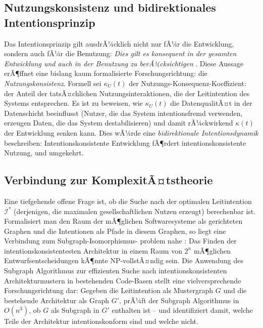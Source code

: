 ﻿\documentclass[a4paper,12pt]{article}
\theoremstyle{definition}
\begin{document}
\subsection{Nutzungskonsistenz und bidirektionales Intentionsprinzip}

Das Intentionsprinzip gilt ausdrÃ¼cklich nicht nur fÃ¼r die Entwicklung,
sondern auch fÃ¼r die Benutzung: \textit{\glqq{}Dies gilt es konsequent in
der gesamten Entwicklung und auch in der Benutzung zu berÃ¼cksichtigen\grqq{}}
\cite{epp2026paradigma}. Diese Aussage erÃ¶ffnet eine bislang kaum
formalisierte Forschungsrichtung: die \emph{Nutzungskonsistenz}. Formell
sei $\kappa_U(t)$ der Nutzungs-Konsequenz-Koeffizient: der Anteil der
tatsÃ¤chlichen Nutzungsinteraktionen, die der Leitintention des Systems
entsprechen. Es ist zu beweisen, wie $\kappa_U(t)$ die DatenqualitÃ¤t
in der Datenschicht beeinflusst (Nutzer, die das System intentionsfremd
verwenden, erzeugen Daten, die das System destabilisieren) und damit
rÃ¼ckwirkend $\kappa(t)$ der Entwicklung senken kann. Dies wÃ¼rde eine
\emph{bidirektionale Intentionsdynamik} beschreiben: Intentionskonsistente
Entwicklung fÃ¶rdert intentionskonsistente Nutzung, und umgekehrt.

\subsection{Verbindung zur KomplexitÃ¤tstheorie}

Eine tiefgehende offene Frage ist, ob die Suche nach der optimalen
Leitintention $\mathcal{I}^*$ (derjenigen, die maximalen gesellschaftlichen
Nutzen erzeugt) berechenbar ist. Formalisiert man den Raum der mÃ¶glichen
Softwaresysteme als gerichteten Graphen und die Intentionen als Pfade
in diesem Graphen, so liegt eine Verbindung zum Subgraph-Isomorphismus-
problem nahe \cite{cook1971complexity, epp2026subgraph}: Das Finden
der intentionskonsistentesten Architektur in einem Raum von $2^n$
mÃ¶glichen Entwurfsentscheidungen kÃ¶nnte NP-vollstÃ¤ndig sein.
Die Anwendung des Subgraph Algorithmus \cite{epp2026subgraph} zur
effizienten Suche nach intentionskonsistenten Architekturmustern
in bestehenden Code-Basen stellt eine vielversprechende Forschungsrichtung
dar: Gegeben die Leitintention als Mustergraph $G$ und die bestehende
Architektur als Graph $G'$, prÃ¼ft der Subgraph Algorithmus in $O(n^3)$,
ob $G$ als Subgraph in $G'$ enthalten ist -- und identifiziert damit,
welche Teile der Architektur intentionskonform sind und welche nicht.
\end{document}
